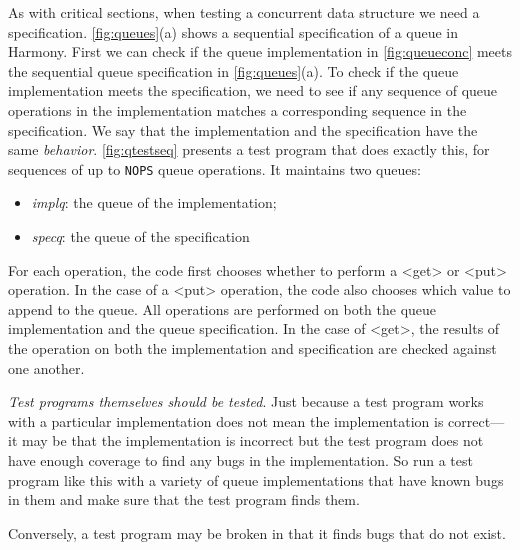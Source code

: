 \documentclass{report}
\begin{document}
As with critical sections, when testing a concurrent data structure
we need a specification.
\autoref{fig:queues}(a) shows a sequential specification of a
queue in Harmony.
First we can check if the queue implementation
in \autoref{fig:queueconc} meets the sequential
queue specification in \autoref{fig:queues}(a).
To check if the queue implementation meets the specification,
we need to see if any sequence of queue operations in the
implementation matches a corresponding sequence in the
specification.
We say that the implementation and the specification
have the same \emph{behavior}.
%
\autoref{fig:qtestseq} presents a test program that does
exactly this, for sequences of up to \texttt{NOPS}
queue operations.
It maintains two queues:
\begin{itemize}
\item[] \textit{implq}: the queue of the implementation;
\item[] \textit{specq}: the queue of the specification
\end{itemize}
For each operation, the code first chooses whether to
perform a <{get}> or <{put}> operation.
In the case of a <{put}> operation, the code also
chooses which value to append to the queue.
All operations are performed on both the queue implementation
and the queue specification.
In the case of <{get}>, the results of the operation
on both the implementation and specification are checked against one another.

\emph{Test programs themselves should be tested}.
Just because a test program works with a particular implementation
does not mean the implementation is correct---it may be that the implementation
is incorrect but the test program does not have enough coverage to find any
bugs in the implementation.
So run a test program like this with a variety of queue implementations that
have known bugs in them and make sure that the test program finds them.

Conversely, a test program may be broken in that it finds bugs that do not exist.

\end{document}

